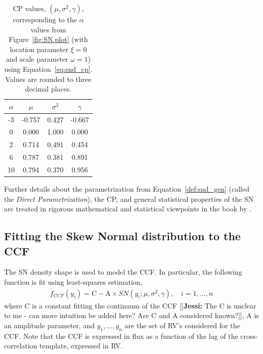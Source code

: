 \documentclass[11pt, oneside]{article}
\newcommand{\jessi}[1]{{\color{Purple}[[\textbf{Jessi: }#1]]}}
\begin{document}
\begin{table}[htbp]
   \centering
   \begin{tabular}{|cccc|} %
\hline
$\alpha$ & $\mu$ & $\sigma^2$ & $\gamma$ \\
\hline
 -3 	&	 -0.757	&	 0.427	&	 -0.667 \\
0	&	 0.000 	&	1.000	&	 0.000 \\
2	&	 0.714	&	 0.491	&	 0.454\\
6	&	 0.787	&	 0.381	&	 0.891\\
10	&	 0.794	&	 0.370	&	 0.956\\
\hline
   \end{tabular}
   \caption{CP values, $(\mu, \sigma^2, \gamma)$, corresponding to the $\alpha$ values from Figure~\ref{fig:SN.plot} (with location parameter $\xi = 0$ and scale parameter $\omega = 1$) using Equation~\eqref{eq:snd_cp}.  Values are rounded to three decimal places.}
   \label{tab:cp_values}
\end{table}
%
Further details about the parametrization from Equation~\eqref{def:snd_gen} (called the \emph{Direct Parametrization}), the CP, and general statistical properties of the SN are treated in rigorous mathematical and statistical viewpoints in the book by \cite{Azzalini2014}.

\subsection{Fitting the Skew Normal distribution to the CCF} \label{sec:3}

The SN density shape is used to model the CCF.  In particular, the following function is fit using least-squares estimation,
%
\begin{eqnarray} \label{eq:3}
f_{CCF}(y_i) = \mathrm{C} - \mathrm{A} \times SN(y_i;\mu, \sigma^2, \gamma), \quad i = 1, \ldots, n
\end{eqnarray}
%
where C is a constant fitting the continuum of the CCF \jessi{The C is unclear to me - can more intuition be added here?  Are C and A considered known?}, A is an amplitude parameter, and $y_1, \ldots, y_n$ are the set of RV's considered for the CCF. Note that the CCF is expressed in flux as a function of the lag of the cross-correlation template, expressed in RV.
\end{document}
